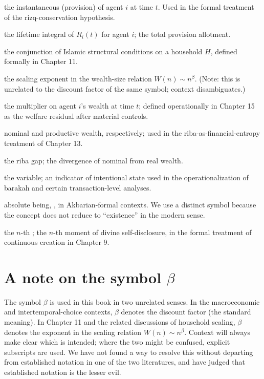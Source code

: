 \begin{notationbox}
\begin{description}[leftmargin=3cm,style=nextline]
    \item[{$R_i(t)$}] the instantaneous  (provision) of
        agent $i$ at time $t$. Used in the formal treatment of the
        rizq-conservation hypothesis.
    \item[{$K_i$}] the lifetime integral of $R_i(t)$ for agent $i$;
        the total provision allotment.
    \item[{$\mathbb{I}(H)$}] the conjunction of Islamic structural
        conditions on a household $H$, defined formally in Chapter 11.
    \item[{$\beta$}] the scaling exponent in the wealth-size relation
        $W(n) \sim n^\beta$. (Note: this is unrelated to the
        discount factor of the same symbol; context disambiguates.)
    \item[{$B_i(t)$}] the  multiplier on agent $i$'s
        wealth at time $t$; defined operationally in Chapter 15 as
        the welfare residual after material controls.
    \item[{$N(t), P(t)$}] nominal and productive wealth, respectively;
        used in the riba-as-financial-entropy treatment of Chapter 13.
    \item[{$G(t) = N(t) - P(t)$}] the riba gap; the divergence of
        nominal from real wealth.
    \item[{$\nu_i$}] the  variable; an indicator of
        intentional state used in the operationalization of barakah
        and certain transaction-level analyses.
    \item[{$\mathbb{W}_t$}] absolute being, , in
        Akbarian-formal contexts. We use a distinct symbol because the
        concept does not reduce to ``existence'' in the modern sense.
    \item[{$\mathcal{T}_n$}] the $n$-th ; the
        $n$-th moment of divine self-disclosure, in the formal
        treatment of continuous creation in Chapter 9.
\end{description}
\end{notationbox}

\section*{A note on the symbol $\beta$}

The symbol $\beta$ is used in this book in two unrelated senses. In
the macroeconomic and intertemporal-choice contexts, $\beta$ denotes
the discount factor (the standard meaning). In Chapter 11 and the
related discussions of household scaling, $\beta$ denotes the
exponent in the scaling relation $W(n) \sim n^\beta$. Context will
always make clear which is intended; where the two might be confused,
explicit subscripts are used. We have not found a way to resolve this
without departing from established notation in one of the two
literatures, and have judged that established notation is the lesser
evil.

